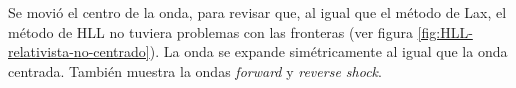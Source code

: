 \documentclass[12pt,a4paper]{book}
\begin{document}
Se movió el centro de la onda, para revisar que, al igual que el método de Lax, el método de HLL no tuviera problemas con las fronteras (ver figura \ref{fig:HLL-relativista-no-centrado}). La onda se expande simétricamente al igual que la onda centrada. También muestra la ondas \emph{forward} y \emph{reverse shock}.

\end{document}
